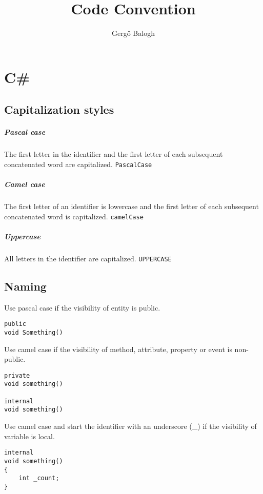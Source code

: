 \documentclass[11pt,a4paper]{book}
\author{Gergő Balogh}
\title{Code Convention}
\begin{document}
\maketitle

\chapter{C\#}

\section{Capitalization styles}
\paragraph{Pascal case} The first letter in the identifier and the first letter of each subsequent concatenated word are capitalized. \verb|PascalCase|
\paragraph{Camel case} The first letter of an identifier is lowercase and the first letter of each subsequent concatenated word is capitalized. \verb|camelCase|
\paragraph{Uppercase} All letters in the identifier are capitalized. \verb|UPPERCASE|

\section{Naming}

\domark Use pascal case if the visibility of entity is public.
\begin{verbatim}
public
void Something()
\end{verbatim}

\domark Use camel case if the visibility of method, attribute, property or event is non-public.
\begin{verbatim}
private
void something()

internal
void something()
\end{verbatim}

\domark Use camel case and start the identifier with an underscore (\_) if the visibility of variable is local.
\begin{verbatim}
internal
void something()
{
    int _count;
}
\end{verbatim}
\end{document}
